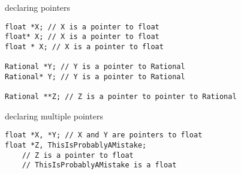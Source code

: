 \begin{frame}[fragile,label=pointerDeclare]{declaring pointers}
\lstset{
    language=C++,
    style=smaller,
    morekeywords=Rational,
}
\begin{lstlisting}
float *X; // X is a pointer to float
float* X; // X is a pointer to float
float * X; // X is a pointer to float

Rational *Y; // Y is a pointer to Rational
Rational* Y; // Y is a pointer to Rational

Rational **Z; // Z is a pointer to pointer to Rational
\end{lstlisting}
\end{frame}

\begin{frame}[fragile,label=pointerDeclareMult]{declaring multiple pointers}
\lstset{
    language=C++,
    style=small,
    morekeywords=Rational,
}
\begin{lstlisting}
float *X, *Y; // X and Y are pointers to float
float *Z, ThisIsProbablyAMistake;
    // Z is a pointer to float
    // ThisIsProbablyAMistake is a float
\end{lstlisting}
\end{frame}

